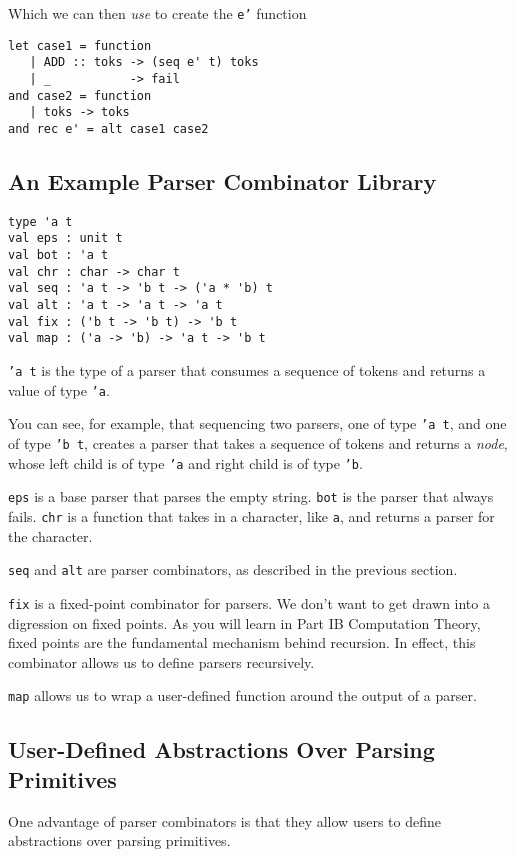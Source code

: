 Which we can then \textit{use} to create the \texttt{e'} function
\begin{verbatim}
let case1 = function
   | ADD :: toks -> (seq e' t) toks
   | _           -> fail
and case2 = function
   | toks -> toks
and rec e' = alt case1 case2
\end{verbatim}

\subsection{An Example Parser Combinator Library}
\begin{verbatim}
type 'a t
val eps : unit t
val bot : 'a t
val chr : char -> char t
val seq : 'a t -> 'b t -> ('a * 'b) t
val alt : 'a t -> 'a t -> 'a t
val fix : ('b t -> 'b t) -> 'b t
val map : ('a -> 'b) -> 'a t -> 'b t
\end{verbatim}
\texttt{'a t} is the type of a parser that consumes a sequence of tokens and returns a value of type \texttt{'a}. 

You can see, for example, that sequencing two parsers, one of type \texttt{'a t}, and one of type \texttt{'b t}, creates a parser that takes a sequence of tokens and returns a \textit{node}, whose left child is of type \texttt{'a} and right child is of type \texttt{'b}.

\texttt{eps} is a base parser that parses the empty string. \texttt{bot} is the parser that always fails. \texttt{chr} is a function that takes in a character, like \texttt{a}, and returns a parser for the character. 

\texttt{seq} and \texttt{alt} are parser combinators, as described in the previous section.

\texttt{fix} is a fixed-point combinator for parsers. We don't want to get drawn into a digression on fixed points. As you will learn in \textsf{Part IB Computation Theory}, fixed points are the fundamental mechanism behind recursion. In effect, this combinator allows us to define parsers recursively.

\texttt{map} allows us to wrap a user-defined function around the output of a parser.

\subsection{User-Defined Abstractions Over Parsing Primitives}
One advantage of parser combinators is that they allow users to define abstractions over parsing primitives. 

